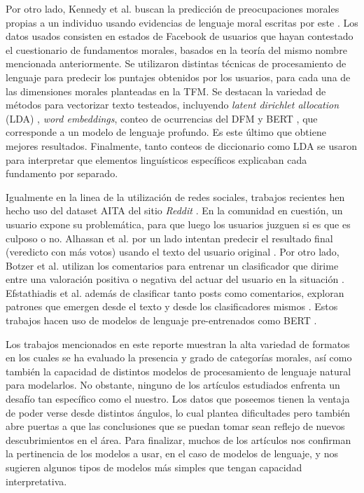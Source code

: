 \documentclass[
	spanish, %
	letterpaper, oneside
]{article}
\begin{document}
\newp Por otro lado, Kennedy et al. buscan la predicción de preocupaciones morales propias a un individuo usando evidencias de lenguaje moral escritas por este \cite{diff}. Los datos usados consisten en estados de Facebook de usuarios que hayan contestado el cuestionario de fundamentos morales, basados en la teoría del mismo nombre mencionada anteriormente. Se utilizaron distintas técnicas de procesamiento de lenguaje para predecir los puntajes obtenidos por los usuarios, para cada una de las dimensiones morales planteadas en la TFM. Se destacan la variedad de métodos para vectorizar texto testeados, incluyendo \textit{latent dirichlet allocation} (LDA) \cite{lda}, \textit{word embeddings}, conteo de ocurrencias del DFM \cite{tfd} y BERT \cite{bert}, que corresponde a un modelo de lenguaje profundo. Es este último que obtiene mejores resultados. Finalmente, tanto conteos de diccionario como LDA se usaron para interpretar que elementos linguísticos específicos explicaban cada fundamento por separado.

\newp Igualmente en la linea de la utilización de redes sociales, trabajos recientes hen hecho uso del dataset AITA del sitio \textit{Reddit} \cite{aita}. En la comunidad en cuestión, un usuario expone su problemática, para que luego los usuarios juzguen si es que es culposo o no. Alhassan et al. por un lado intentan predecir el resultado final (veredicto con más votos) usando el texto del usuario original \cite{alh}. Por otro lado, Botzer et al. utilizan los comentarios para entrenar un clasificador que dirime entre una valoración positiva o negativa del actuar del usuario en la situación \cite{botzer}. Efstathiadis et al. además de clasificar tanto posts como comentarios, exploran patrones que emergen desde el texto y desde los clasificadores mismos \cite{Efs}. Estos trabajos hacen uso de modelos de lenguaje pre-entrenados como BERT \cite{bert}.


Los trabajos mencionados en este reporte muestran la alta variedad de formatos en los cuales se ha evaluado la presencia y grado de categorías morales, así como también la capacidad de distintos modelos de procesamiento de lenguaje natural para modelarlos. No obstante, ninguno de los artículos estudiados enfrenta un desafío tan específico como el nuestro. Los datos que poseemos tienen la ventaja de poder verse desde distintos ángulos, lo cual plantea dificultades pero también abre puertas a que las conclusiones que se puedan tomar sean reflejo de nuevos descubrimientos en el área. Para finalizar, muchos de los artículos nos confirman la pertinencia de los modelos a usar, en el caso de modelos de lenguaje, y nos sugieren algunos tipos de modelos más simples que tengan capacidad interpretativa.
\end{document}
